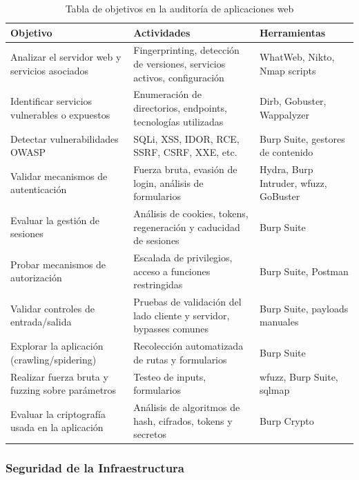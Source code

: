 \documentclass[a4paper, 11pt]{article}
\begin{document}
\begin{table}[H]
\centering
\renewcommand{\arraystretch}{1.4}
\begin{tabular}{|p{4.3cm}|p{6.1cm}|p{4.5cm}|}
\hline
\textbf{Objetivo} & \textbf{Actividades} & \textbf{Herramientas} \\
\hline
Analizar el servidor web y servicios asociados & Fingerprinting, detección de versiones, servicios activos, configuración & WhatWeb, Nikto, Nmap scripts \\
\hline
Identificar servicios vulnerables o expuestos & Enumeración de directorios, endpoints, tecnologías utilizadas & Dirb, Gobuster, Wappalyzer \\
\hline
Detectar vulnerabilidades OWASP & SQLi, XSS, IDOR, RCE, SSRF, CSRF, XXE, etc. & Burp Suite, gestores de contenido \\
\hline
Validar mecanismos de autenticación & Fuerza bruta, evasión de login, análisis de formularios & Hydra, Burp Intruder, wfuzz, GoBuster \\
\hline
Evaluar la gestión de sesiones & Análisis de cookies, tokens, regeneración y caducidad de sesiones & Burp Suite \\
\hline
Probar mecanismos de autorización & Escalada de privilegios, acceso a funciones restringidas & Burp Suite, Postman \\
\hline
Validar controles de entrada/salida & Pruebas de validación del lado cliente y servidor, bypasses comunes & Burp Suite, payloads manuales \\
\hline
Explorar la aplicación (crawling/spidering) & Recolección automatizada de rutas y formularios & Burp Suite \\
\hline
Realizar fuerza bruta y fuzzing sobre parámetros & Testeo de inputs, formularios & wfuzz, Burp Suite, sqlmap \\
\hline
Evaluar la criptografía usada en la aplicación & Análisis de algoritmos de hash, cifrados, tokens y secretos & Burp Crypto \\
\hline
\end{tabular}
\caption{Tabla de objetivos en la auditoría de aplicaciones web}
\end{table}






\subsubsection{Seguridad de la Infraestructura}
\end{document}

